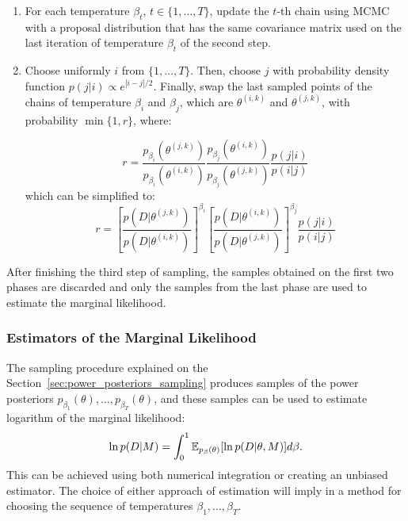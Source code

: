 \begin{enumerate}
    \item{For each temperature $\beta_t$, $t \in \{1, \ldots, T\}$, 
        update the $t$-th chain using MCMC with a proposal distribution
        that has the same covariance matrix used on the last iteration
        of temperature $\beta_t$ of the second step.}
    \item{Choose uniformly $i$ from $\{1, \ldots, T\}$. Then, choose
        $j$ with probability density function $p (j | i) \propto 
        e^{|i - j| / 2}$. Finally, swap the last sampled points of 
        the chains of temperature $\beta_i$ and $\beta_j$, which are
        $\theta^{(i, k)}$ and $\theta^{(j, k)}$, with probability 
        $\min\{1, r\}$, where: }

    \begin{equation*}
        r = \frac{p_{\beta_i}\left(\theta^{(j, k)}\right)}
             {p_{\beta_i}\left(\theta^{(i, k)}\right)}
        \frac{p_{\beta_j}\left(\theta^{(i, k)}\right)}
             {p_{\beta_j}\left(\theta^{(j, k)}\right)}
        \frac{p (j | i)}
             {p (i | j)}
    \end{equation*}
    which can be simplified to:
    \begin{equation*}
        r = \left[\frac{p \left(D | \theta^{(j, k)}\right)}
                {p \left(D | \theta^{(i, k)}\right)}\right]^{\beta_i}
            \left[\frac{p \left(D | \theta^{(i, k)}\right)}
                {p \left(D | \theta^{(j, k)}\right)}\right]^{\beta_j}
            \frac{p (j | i)}
                 {p (i | j)}
    \end{equation*}
\end{enumerate}

After finishing the third step of sampling, the samples obtained on the
first two phases are discarded and only the samples from the last phase
are used to estimate the marginal likelihood.

\subsubsection{Estimators of the Marginal Likelihood}
The sampling procedure explained on the 
Section~\ref{sec:power_posteriors_sampling} produces samples of the 
power posteriors $p_{\beta_1} (\theta), \ldots, p_{\beta_T} (\theta)$, 
and these samples can be used to estimate logarithm of the marginal 
likelihood:
\begin{equation}
    \ln p (D | M) = \int_0^1 \mathbb{E}_{p_\beta (\theta)} 
        [\ln p(D|\theta, M)]d\beta.
    \label{eq:marginal_likelihood_again}
\end{equation}
This can be achieved using both numerical integration or creating an
unbiased estimator. The choice of either approach of estimation will
imply in a method for choosing the sequence of temperatures $\beta_1, 
\ldots, \beta_T$. 

